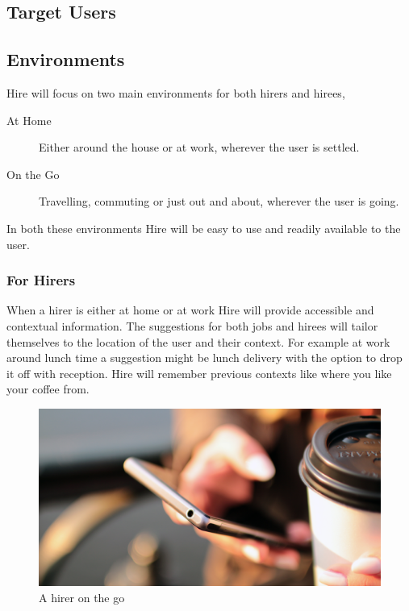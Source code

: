 \documentclass[11pt]{article}
\begin{document}
\subsection{Target Users}


\subsection{Environments}



Hire will focus on two main environments for both hirers and hirees,

\begin{description}
    \item[At Home] Either around the house or at work, wherever the user is settled.
    \item[On the Go] Travelling, commuting or just out and about, wherever the user is going.
\end{description}

In both these environments Hire will be easy to use and readily available to the user.

\subsubsection{For Hirers}

When a hirer is either at home or at work Hire will provide accessible and contextual information. The suggestions for both jobs and hirees will tailor themselves to the location of the user and their context. For example at work around lunch time a suggestion might be lunch delivery with the option to drop it off with reception. Hire will remember previous contexts like where you like your coffee from.


\begin{figure}[htb]
\begin{center}
\hspace*{-4cm}
\includegraphics[width=1.5\textwidth]{Img/hands-coffee-smartphone-technology}
\end{center}
\caption{A hirer on the go}
\end{figure}
\end{document}
